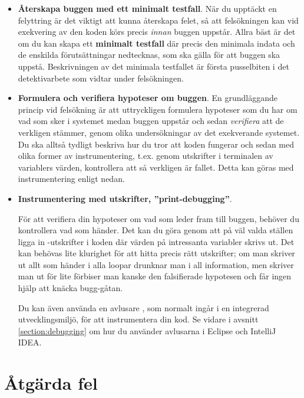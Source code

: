 \begin{itemize}

\item \textbf{Återskapa buggen med ett minimalt testfall}. 
När du upptäckt en felyttring är det viktigt att kunna återskapa felet, så att felsökningen kan vid exekvering av den koden körs precis \emph{innan} buggen uppstår. Allra bäst är det om du kan skapa ett \textbf{minimalt testfall} där precis den minimala indata och de enskilda förutsättningar nedtecknas, som ska gälla för att buggen ska uppstå. Beskrivningen av det minimala testfallet är första pusselbiten i det detektivarbete som vidtar under felsökningen.

\item \textbf{Formulera och verifiera hypoteser om buggen}. En grundläggande princip vid felsökning är att uttryckligen formulera hypoteser som du har om vad som sker i systemet medan buggen uppstår och sedan \emph{verifiera} att de verkligen stämmer, genom olika undersökningar av det exekverande systemet. Du ska alltså tydligt beskriva hur du tror att koden fungerar och sedan med olika former av instrumentering, t.ex. genom utskrifter i terminalen av variablers värden, kontrollera att så verkligen är fallet. Detta kan göras med instrumentering enligt nedan.

\item \textbf{Instrumentering med utskrifter, ''print-debugging''}.

För att verifiera din hypoteser om vad som leder fram till buggen, behöver du kontrollera vad som händer. Det kan du göra genom att på väl valda ställen ligga in -utskrifter i koden där värden på intressanta variabler skrivs ut. Det kan behövas lite klurighet för att hitta precis rätt utskrifter; om man skriver ut allt som händer i alla loopar drunknar man i all information, men skriver man ut för lite förbiser man kanske den falsifierade hypotesen och får ingen hjälp att knäcka bugg-gåtan.  

Du kan även använda en avlusare , som normalt ingår i en integrerad utvecklingsmiljö, för att instrumentera din kod. Se vidare i avsnitt \ref{section:debugging} om hur du använder avlusarna i Eclipse och IntelliJ IDEA.

\end{itemize}



\section{Åtgärda fel}

